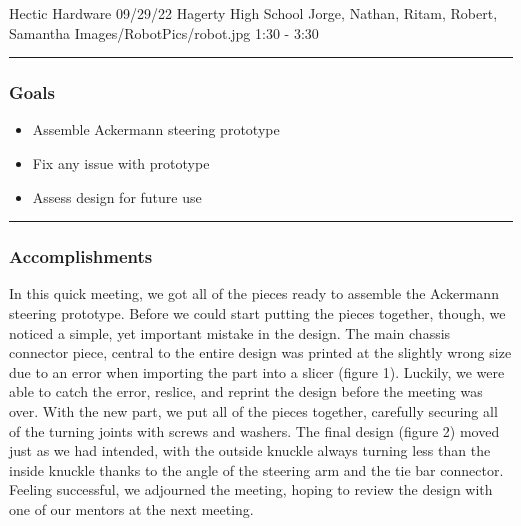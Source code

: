 \insertmeeting 
	{Hectic Hardware} 
	{09/29/22} 
	{Hagerty High School}
	{Jorge, Nathan, Ritam, Robert, Samantha}
	{Images/RobotPics/robot.jpg}
	{1:30 - 3:30}
	
\noindent\hfil\rule{\textwidth}{.4pt}\hfil
\subsubsection*{Goals}
\begin{itemize}
    \item Assemble Ackermann steering prototype
    \item Fix any issue with prototype
    \item Assess design for future use



\end{itemize} 

\noindent\hfil\rule{\textwidth}{.4pt}\hfil

\subsubsection*{Accomplishments}
In this quick meeting, we got all of the pieces ready to assemble the Ackermann steering prototype. Before we could start putting the pieces together, though, we noticed a simple, yet important mistake in the design. The main chassis connector piece, central to the entire design was printed at the slightly wrong size due to an error when importing the part into a slicer (figure 1). Luckily, we were able to catch the error, reslice, and reprint the design before the meeting was over. With the new part, we put all of the pieces together, carefully securing all of the turning joints with screws and washers. The final design (figure 2) moved just as we had intended, with the outside knuckle always turning less than the inside knuckle thanks to the angle of the steering arm and the tie bar connector. Feeling successful, we adjourned the meeting, hoping to review the design with one of our mentors at the next meeting.


 

